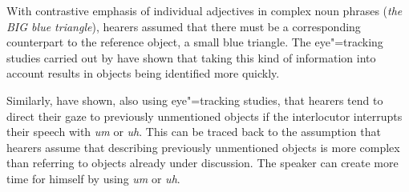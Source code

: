 With contrastive emphasis of individual adjectives in complex noun phrases
(\eg \emph{the BIG blue triangle}), hearers assumed that there must be a corresponding counterpart to the reference object, \eg a small blue triangle.
The eye"=tracking studies carried out by \citet{TSKES96a} have shown that taking this kind of information into account
results in objects being identified more quickly.

Similarly, \citet{ATAF2004a} have shown, also using eye"=tracking studies, that hearers tend to direct their gaze
to previously unmentioned objects if the interlocutor interrupts their speech with \emph{um} or \emph{uh}.
This can be traced back to the assumption that hearers assume that describing previously unmentioned objects is more
complex than referring to objects already under discussion. The speaker can create more time for himself
by using \emph{um}
or \emph{uh}.

